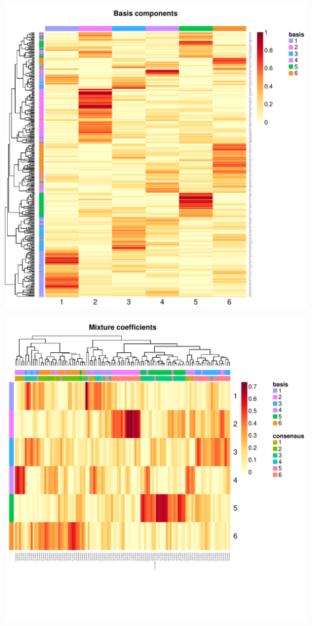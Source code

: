 \documentclass{article}
\begin{document}
\begin{knitrout}
{\centering \includegraphics[width=\maxwidth]{figure/nmf-plots-2} 

}


\begin{kframe}\begin{alltt}
\end{alltt}
\end{kframe}

{\centering \includegraphics[width=\maxwidth]{figure/nmf-plots-3} 

}



\end{knitrout}
\end{document}
